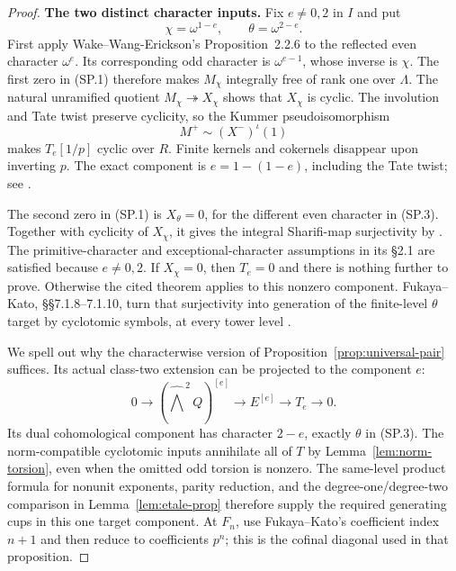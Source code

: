 \documentclass[11pt,a4paper]{article}
\theoremstyle{definition}
\begin{document}
\begin{proof}
\par\medskip\noindent\textbf{The two distinct character inputs.}
Fix $e\ne0,2$ in $I$ and put
\[
              \chi=\omega^{1-e},\qquad
              \theta=\omega^{2-e}.
 \tag{SP.3}
\]
First apply Wake--Wang-Erickson's Proposition~2.2.6 to the
reflected even character $\omega^e$. Its corresponding odd
character is $\omega^{e-1}$, whose inverse is $\chi$.
The first zero in (SP.1) therefore makes $M_\chi$ integrally
free of rank one over $\Lambda$. The natural unramified
quotient $M_\chi\twoheadrightarrow X_\chi$ shows that
$X_\chi$ is cyclic. The involution and Tate twist preserve
cyclicity, so the Kummer pseudoisomorphism
\[
                         M^+\sim(X^-)^\iota(1)
\]
makes $T_e[1/p]$ cyclic over $R$. Finite kernels and cokernels
disappear upon inverting $p$. The exact component is $e=1-(1-e)$,
including the Tate twist; see
\cite[Proposition~3.4.7 and Corollary~3.4.8,
p.~92]{SharifiIwasawaNotes}.

The second zero in (SP.1) is $X_\theta=0$, for the different
even character in (SP.3). Together with cyclicity of $X_\chi$,
it gives the integral Sharifi-map surjectivity by
\cite[Corollary~5.1.2 and its proof, p.~11]{WakeWangErickson2017}.
The primitive-character and exceptional-character assumptions
in its \S2.1 are satisfied because $e\ne0,2$. If $X_\chi=0$,
then $T_e=0$ and there is nothing further to prove. Otherwise
the cited theorem applies to this nonzero component.
Fukaya--Kato, \S\S7.1.8--7.1.10, turn that surjectivity into
generation of the finite-level $\theta$ target by cyclotomic
symbols, at every tower level
\cite[p.~86]{FukayaKato2012}.

We spell out why the characterwise version of
Proposition~\ref{prop:universal-pair} suffices. Its actual
class-two extension can be projected to the component $e$:
\[
0\longrightarrow
 (\widehat{\bigwedge}^{\,2}Q)^{[e]}
 \longrightarrow E^{[e]}
 \longrightarrow T_e\longrightarrow0.
\]
Its dual cohomological component has character $2-e$, exactly
$\theta$ in (SP.3). The norm-compatible cyclotomic inputs
annihilate all of $T$ by Lemma~\ref{lem:norm-torsion}, even
when the omitted odd torsion is nonzero. The same-level product
formula for nonunit exponents, parity reduction, and the
degree-one/degree-two comparison in
Lemma~\ref{lem:etale-prop} therefore supply the required
generating cups in this one target component. At $F_n$, use
Fukaya--Kato's coefficient index $n+1$ and then reduce to
coefficients $p^n$; this is the cofinal diagonal used in that
proposition.


\end{proof}
\end{document}
